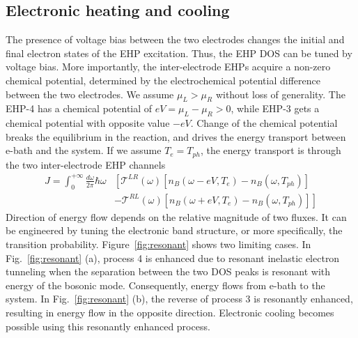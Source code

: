 \documentclass[aps
,floatfix,footinbib,
preprint
]{revtex4-1}
\begin{document}
\subsection{Electronic heating and cooling}
The presence of voltage bias between the two electrodes changes the initial and final electron states of the EHP excitation. Thus, the EHP DOS can be tuned by voltage bias. More importantly, the inter-electrode EHPs acquire a non-zero chemical potential, determined by the electrochemical potential difference between the two electrodes. We assume $\mu_L>\mu_R$ without loss of generality. The EHP-4 has a chemical potential of $eV=\mu_L-\mu_R>0$, while EHP-3 gets a chemical potential with opposite value $-eV$. Change of the chemical potential breaks the equilibrium in the reaction, and drives the energy transport between e-bath and the system. If we assume $T_e=T_{ph}$, the energy transport is through the two inter-electrode EHP channels
\begin{align*}
J = \int_0^{+\infty}\frac{d\omega}{2\pi}\hbar\omega &\left[\mathcal{T}^{LR}(\omega)[n_B(\omega-eV,{T}_{e})-n_B(\omega,T_{ph})]\right.\nonumber\\
&\left.-\mathcal{T}^{RL}(\omega)[n_B(\omega+eV,{T}_{e})-n_B(\omega,T_{ph})]\right]
\label{eq:jjtrans2}
\end{align*}
Direction of energy flow depends on the relative magnitude of two fluxes. It can be engineered by tuning the electronic band structure, or more specifically, the transition probability. Figure~\ref{fig:resonant} shows two limiting cases. In Fig.~\ref{fig:resonant} (a), process 4 is enhanced due to resonant inelastic electron tunneling when the separation between the two DOS peaks is resonant with energy of the bosonic mode. Consequently, energy flows from e-bath to the system. In Fig.~\ref{fig:resonant} (b), the reverse of process 3 is resonantly enhanced, resulting in energy flow in the opposite direction. Electronic cooling becomes possible using this resonantly enhanced process.




\end{document}
